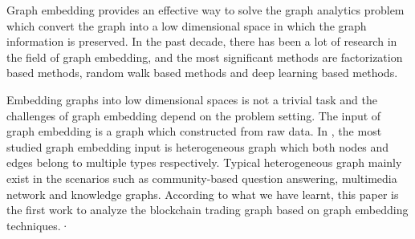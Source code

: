 Graph embedding provides an effective way to solve the graph analytics problem which convert the graph into a low dimensional space in which the graph information is preserved. In the past decade, there has been a lot of research in the field of graph embedding, and the most significant methods are factorization based methods\cite{ahmed2013distributed}\cite{belkin2002laplacian}\cite{roweis2000nonlinear}, random walk based methods\cite{perozzi2014deepwalk}\cite{grover2016node2vec} and deep learning based methods\cite{wang2016structural}\cite{kipf2016semi}. 

Embedding graphs into low dimensional spaces is not a trivial task and the challenges of graph embedding depend on the problem setting. The input of graph embedding is a graph which constructed from raw data. In \cite{goyal2018graph}, the most studied graph embedding input is heterogeneous graph which both nodes and edges belong to multiple types respectively. Typical heterogeneous graph mainly exist in the scenarios such as community-based question answering, multimedia network and knowledge graphs. According to what we have learnt, this paper is the first work to analyze the blockchain trading graph based on graph embedding techniques.·